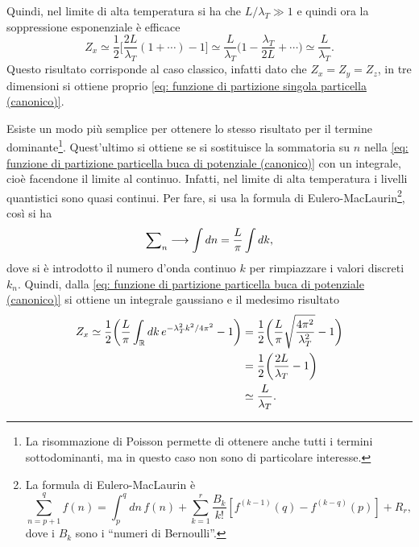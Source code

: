 \begin{caso}
    Quindi, nel limite di alta temperatura si ha che $L/\lambda_T \gg 1$ e quindi ora la soppressione esponenziale è efficace
    \begin{equation}
    \label{eq: sviluppo alta T funzione di partizione particella buca di potenziale  (canonico)}
        Z_x \simeq \frac{1}{2}\bigg[\frac{2L}{\lambda_T}(1 + \cdots) - 1\bigg] \simeq \frac{L}{\lambda_T}\bigg(1 - \frac{\lambda_T}{2L} + \cdots \bigg) \simeq \frac{L}{\lambda_T}.
    \end{equation}
    Questo risultato corrisponde al caso classico, infatti dato che $Z_x  = Z_y = Z_z$, in tre dimensioni si ottiene proprio \eqref{eq: funzione di partizione singola particella (canonico)}.
\end{caso}
\begin{obs}
    Esiste un modo più semplice per ottenere lo stesso risultato per il termine dominante\footnote{La risommazione di Poisson permette di ottenere anche tutti i termini sottodominanti, ma in questo caso non sono di particolare interesse.}. Quest'ultimo si ottiene se si sostituisce la sommatoria su $n$ nella \eqref{eq: funzione di partizione particella buca di potenziale (canonico)} con un integrale, cioè facendone il limite al continuo. Infatti, nel limite di alta temperatura i livelli quantistici sono quasi continui. Per fare, si usa la formula di Eulero-MacLaurin\footnote{La formula di Eulero-MacLaurin è 
    \begin{equation}
        \sum_{n = p+1}^qf(n) = \int_p^q dn\,f(n) + \sum_{k=1}^r\frac{B_k}{k!}[f^{(k-1)}(q) - f^{(k-q)}(p)] + R_r,
    \end{equation}
    dove i $B_k$ sono i ``numeri di Bernoulli''.}, così si ha
    \begin{equation}
        \sum\nolimits_n \longrightarrow \int dn = \frac{L}{\pi} \int dk,
    \end{equation}
    dove si è introdotto il numero d'onda continuo $k$ per rimpiazzare i valori discreti $k_n$. Quindi, dalla \eqref{eq: funzione di partizione particella buca di potenziale (canonico)} si ottiene un integrale gaussiano e il medesimo risultato
    \begin{equation}
        \begin{split}
            Z_x \simeq \frac{1}{2} \bigg( \frac{L}{\pi} \int_{\mathbb{R}} dk\, e^{-\lambda_T^2k^2/4\pi^2} - 1 \bigg) &= \frac{1}{2} \bigg( \frac{L}{\pi} \sqrt{\frac{4\pi^2}{\lambda_T^2}} - 1 \bigg)  \\
            &= \frac{1}{2} \bigg( \frac{2L}{\lambda_T} - 1 \bigg) \\
            &\simeq \frac{L}{\lambda_T}.
        \end{split}
    \end{equation}
\end{obs}
